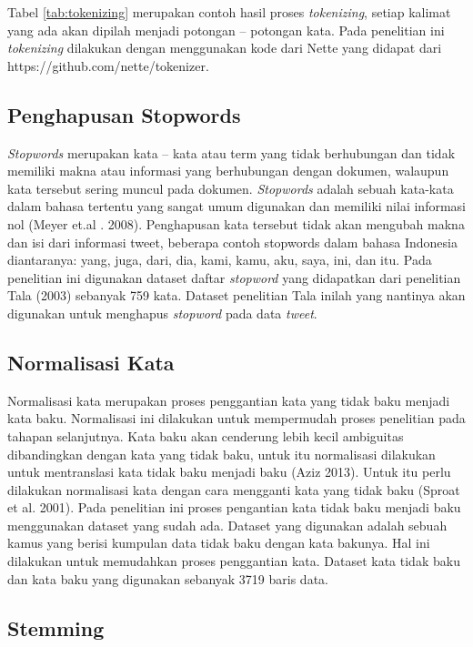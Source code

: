 Tabel \ref{tab:tokenizing} merupakan contoh hasil proses \textit{tokenizing}, setiap kalimat yang ada akan dipilah menjadi potongan – potongan kata. Pada penelitian ini \textit{tokenizing} dilakukan dengan menggunakan kode dari Nette yang didapat dari https://github.com/nette/tokenizer.


\subsection*{Penghapusan Stopwords}

\textit{Stopwords} merupakan kata – kata atau term yang tidak berhubungan dan tidak memiliki makna atau informasi yang berhubungan dengan dokumen, walaupun kata tersebut sering muncul pada dokumen. \textit{Stopwords} adalah sebuah kata-kata dalam bahasa tertentu yang sangat umum digunakan dan memiliki nilai informasi nol (Meyer et.al . 2008). Penghapusan kata tersebut tidak akan mengubah makna dan isi dari informasi tweet, beberapa contoh stopwords dalam bahasa  Indonesia diantaranya: yang, juga, dari, dia, kami, kamu, aku, saya, ini, dan itu. Pada penelitian ini digunakan dataset daftar \textit{stopword} yang  didapatkan dari penelitian Tala (2003) sebanyak 759 kata. Dataset penelitian Tala inilah yang nantinya akan digunakan untuk menghapus \textit{stopword} pada data \textit{tweet}.


\subsection*{Normalisasi Kata}

Normalisasi kata merupakan proses penggantian kata yang tidak baku menjadi kata baku. Normalisasi ini dilakukan untuk mempermudah proses penelitian pada tahapan selanjutnya. Kata baku akan cenderung lebih kecil ambiguitas dibandingkan dengan kata yang tidak baku, untuk itu normalisasi dilakukan untuk mentranslasi kata tidak baku menjadi baku (Aziz 2013). Untuk itu perlu dilakukan normalisasi kata dengan cara mengganti kata yang tidak baku (Sproat et al. 2001). Pada penelitian ini proses pengantian kata tidak baku menjadi baku menggunakan dataset yang sudah ada. Dataset yang digunakan adalah sebuah kamus yang berisi kumpulan data tidak baku dengan kata bakunya. Hal ini dilakukan untuk memudahkan proses penggantian kata. Dataset kata tidak baku dan kata baku yang digunakan sebanyak 3719 baris data. 

\subsection*{Stemming}

